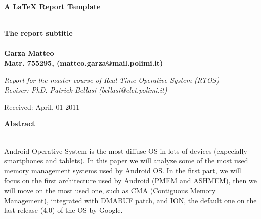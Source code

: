 \documentclass[a4paper,10pt]{article}
\newenvironment*{mytitle}{\begin{LARGE}\bf}{\end{LARGE}\\}%
\newenvironment*{mysubtitle}{\bf}{\\[1.5ex]}%
\newenvironment*{myabstract}{\begin{Large}\bf}{\end{Large}\\[2.5ex]}%
\begin{document}
\begin{mytitle}A LaTeX Report Template\end{mytitle}
\begin{mysubtitle}The report subtitle\end{mysubtitle}
%
%
\\
Garza Matteo\\
Matr. 755295, (matteo.garza@mail.polimi.it)\\
\hspace{10ex}
\begin{flushright}
\emph{Report for the master course of Real Time Operative System (RTOS)}\\
\emph{Reviser: PhD. Patrick Bellasi (bellasi@elet.polimi.it)}
\end{flushright}

Received: April, 01 2011\\
\hspace{10ex}

\begin{myabstract} Abstract \end{myabstract}
Android Operative System is the most diffuse OS in lots of devices (expecially smartphones and tablets).
In this paper we will analyze some of the most used memory management systems used by Android OS.
In the first part, we will focus on the first architecture used by Android (PMEM and ASHMEM), then we will move on
the most used one, such as CMA (Contiguous Memory Management), integrated with DMABUF patch, and ION, the default one
on the last release (4.0) of the OS by Google.
\end{document}
